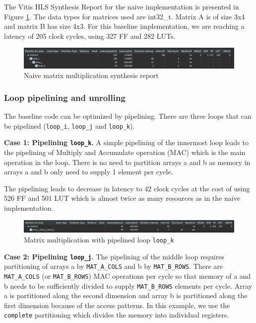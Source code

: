 \documentclass[a4paper, twoside]{report}
\theoremstyle{definition}
\numberwithin{equation}{section}
\begin{document}
The Vitis HLS Synthesis Report for the naive implementation is presented in Figure \ref{fig:matmul_naive_synth}.
The data types for matrices used are int32\_t. Matrix A is of size 3x4 and matrix B has size 4x3.
For this baseline implementation, we are reaching a latency of 205 clock cycles, using 327 FF and 282 LUTs.


\begin{figure}[h!]
    \centering
    \includegraphics[width=\textwidth]{matmul_naive_synth.png}
    \caption{Naive matrix multiplication synthesis report}
    \label{fig:matmul_naive_synth}
\end{figure}


\subsubsection{Loop pipelining and unrolling} \label{sec:loop_pipelining_unrolling}

The baseline code can be optimized by pipelining.
There are three loops that can be pipelined (\texttt{loop\_i}, \texttt{loop\_j} and \texttt{loop\_k}).

\textbf{Case 1: Pipelining \texttt{loop\_k}.} A simple pipelining of the innermost loop
leads to the pipelining of Multiply and Accumulate operation (MAC) which is the main operation in the loop.
There is no need to partition arrays a and b as memory in arrays a and b only need
to supply 1 element per cycle.

The pipelining leads to decrease in latency to 42 clock cycles at the cost of using
526 FF and 501 LUT which is almost twice as many resources as in the naive implementation.

\begin{figure}[h!]
    \centering
    \includegraphics[width=\textwidth]{matmul_pipek_synth.png}
    \caption{Matrix multiplication with pipelined loop \texttt{loop\_k}}
    \label{fig:matmul_pipek_synth}
\end{figure}

\textbf{Case 2: Pipelining \texttt{loop\_j}.}
The pipelining of the middle loop requires partitioning of arrays a by \texttt{MAT\_A\_COLS} and b by \texttt{MAT\_B\_ROWS}.
There are \texttt{MAT\_A\_COLS} (or \texttt{MAT\_B\_ROWS}) MAC operations per cycle so that
memory of a and b needs to be sufficiently divided to supply \texttt{MAT\_B\_ROWS} elements per cycle.
Array a is partitioned along the second dimension and array b is partitioned along the first dimension
because of the access patterns.
In this example, we use the \texttt{complete} partitioning which divides the memory into
individual registers.
\end{document}
